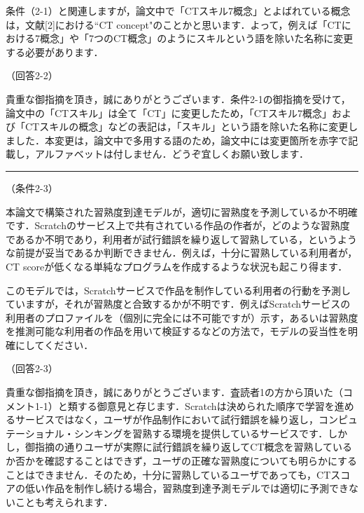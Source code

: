\documentclass{jarticle} %
\def\subsection#1{ \vspace{1pc} {\gt #1} }
\def\nextans{ \vspace{2pc} \hrule }
\begin{document}
条件（2-1）と関連しますが，論文中で「CTスキル7概念」とよばれている概念は，文献[2]における``CT concept"のことかと思います．よって，例えば「CTにおける7概念」や「7つのCT概念」のようにスキルという語を除いた名称に変更する必要があります．

\subsection{（回答2-2）}

貴重な御指摘を頂き，誠にありがとうございます．条件2-1の御指摘を受けて，論文中の「CTスキル」は全て「CT」に変更したため，「CTスキル7概念」および「CTスキルの概念」などの表記は，「スキル」という語を除いた名称に変更しました．本変更は，論文中で多用する語のため，論文中には変更箇所を赤字で記載し，アルファベットは付しません．どうぞ宜しくお願い致します．


\newpage
\nextans
\subsection{（条件2-3）}

本論文で構築された習熟度到達モデルが，適切に習熟度を予測しているか不明確です．Scratchのサービス上で共有されている作品の作者が，どのような習熟度であるか不明であり，利用者が試行錯誤を繰り返して習熟している，というような前提が妥当であるか判断できません．例えば，十分に習熟している利用者が，CT scoreが低くなる単純なプログラムを作成するような状況も起こり得ます．

このモデルでは，Scratchサービスで作品を制作している利用者の行動を予測していますが，それが習熟度と合致するかが不明です．例えばScratchサービスの利用者のプロファイルを（個別に完全には不可能ですが）示す，あるいは習熟度を推測可能な利用者の作品を用いて検証するなどの方法で，モデルの妥当性を明確にしてください．

\subsection{（回答2-3）}

貴重な御指摘を頂き，誠にありがとうございます．査読者1の方から頂いた（コメント1-1）と類する御意見と存じます．Scratchは決められた順序で学習を進めるサービスではなく，ユーザが作品制作において試行錯誤を繰り返し，コンピュテーショナル・シンキングを習熟する環境を提供しているサービスです．しかし，御指摘の通りユーザが実際に試行錯誤を繰り返してCT概念を習熟しているか否かを確認することはできず，ユーザの正確な習熟度についても明らかにすることはできません．そのため，十分に習熟しているユーザであっても，CTスコアの低い作品を制作し続ける場合，習熟度到達予測モデルでは適切に予測できないことも考えられます．
\end{document}
